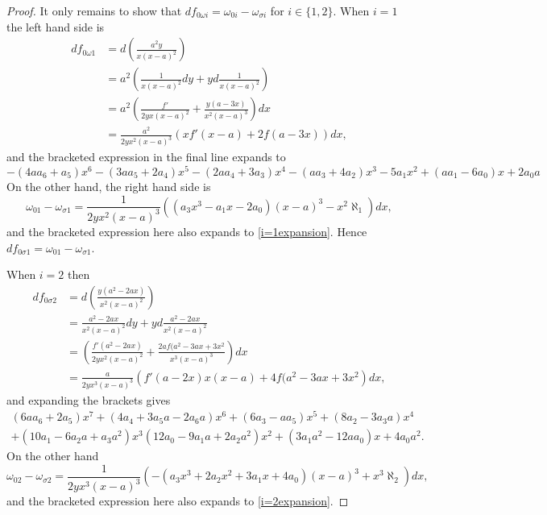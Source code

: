 \documentclass[draft, 11pt]{article} %
\theoremstyle{plain}
\theoremstyle{remark}
\begin{document}
\begin{proof}
It only remains to show that $df_{0 \omega i} = \omega_{0 i} - \omega_{\sigma i}$ for $i \in \{ 1, 2\}$.
When $i=1$ the left hand side is 
\begin{align*}
df_{0 \omega 1} & = d \left( \frac{a^2y}{x(x-a)^2} \right)  \\
& = a^2\left( \frac{1}{x(x-a)^2}dy + y d \frac{1}{x(x-a)^2} \right) \\
 & = a^2 \left( \frac{f'}{2yx(x-a)^2} + \frac{y(a-3x)}{x^2(x-a)^3} \right) dx \\
& = \frac{a^2}{2yx^2(x-a)^3} \left( xf'(x-a) + 2f(a-3x) \right) dx,
\end{align*}
and the bracketed expression in the final line expands to 
\begin{equation}\label{i=1expansion}
-(4aa_6+a_5)x^6-(3aa_5+2a_4)x^5-(2aa_4+3a_3)x^4-(aa_3+4a_2)x^3-5a_1x^2+(aa_1-6a_0)x+2a_0a
\end{equation}
On the other hand, the right hand side is
\begin{equation*}
\omega_{0 1} - \omega_{\sigma 1}  = \frac{1}{2yx^2(x-a)^3} \left( (a_3x^3 -a_1x-2a_0)(x-a)^3 - x^2\aleph_1\right )dx,
\end{equation*}
and the bracketed expression here also expands to \eqref{i=1expansion}.
Hence $df_{0 \sigma 1} = \omega_{0 1} - \omega_{\sigma 1}$.

When $i=2$ then 
\begin{align*}
df_{0 \sigma 2} & = d \left( \frac{y(a^2 -2ax)}{x^2(x-a)^2} \right) \\
& = \frac{a^2-2ax}{x^2(x-a)^2} dy + y d \frac{a^2-2ax}{x^2(x-a)^2} \\
& = \left( \frac{f'(a^2-2ax)}{2yx^2(x-a)^2} + \frac{2af(a^2-3ax+3x^2}{x^3(x-a)^3} \right) dx \\
& = \frac{a}{2yx^3(x-a)^3} \left( f'(a-2x)x(x-a) + 4f(a^2-3ax+3x^2 \right) dx,
\end{align*}
and expanding the brackets gives
\begin{multline}\label{i=2expansion}
(6aa_6+2a_5)x^7+(4a_4+3a_5a-2a_6a)x^6+(6a_3-aa_5)x^5+(8a_2-3a_3a)x^4 \\ + (10a_1 -6a_2a+a_3a^2)x^3 
(12a_0-9a_1a+2a_2a^2)x^2 + (3a_1a^2-12aa_0)x + 4a_0a^2.
\end{multline}
On the other hand
\begin{equation*}
\omega_{0 2} - \omega_{\sigma 2} = \frac{1}{2yx^3(x-a)^3}\left( -(a_3x^3+2a_2x^2+3a_1x+4a_0)(x-a)^3 + x^3\aleph_2 \right) dx,
\end{equation*}
and the bracketed expression here also expands to \eqref{i=2expansion}.
\end{proof}
\end{document}
